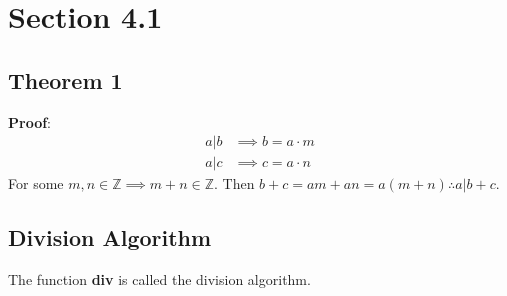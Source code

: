 \documentclass{article}
\begin{document}
\newcommand{\hr}{\par\noindent\rule{\textwidth}{0.4pt}}

\newcommand{\bc}[1]{
	\begin{equation*}
		\begin{boxed}
			{#1}
		\end{boxed}
	\end{equation*}
}

\newcommand{\cond}[2]{
	\ifmmode
	{#1} \quad {#2}
	\else
	$$ {#1} \quad {#2} $$
	\fi
}

\newcommand{\matr}[1]{
	\ifmmode \bm{#1}
	\else \textit{\textbf{#1}}
	\fi
}
\newcommand{\vect}[1]{
	\ifmmode \mathbf{#1}
	\else \textbf{#1}
	\fi
}

\newcommand{\modulus}{\text{mod }}


\newcommand{\lcm}{\text{lcm}}

\tableofcontents

\section{Section 4.1}

\subsection{Theorem 1}

\textbf{Proof}:
\begin{align*}
	a \vert b & \implies b = a \cdot m \\
	a \vert c & \implies c = a \cdot n
\end{align*}
For some $ m, n \in \mathbb{Z} \implies m + n \in \mathbb{Z} $. Then $ b + c = am + an = a(m + n) \therefore a \vert b + c $.

\subsection{Division Algorithm}

The function \textbf{div} is called the division algorithm.
\end{document}
